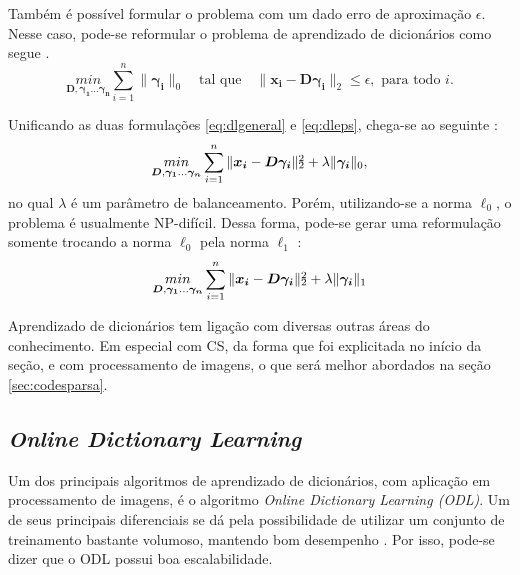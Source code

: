 \documentclass[cic,tc]{iiufrgs}
\def\SPSB#1#2{\rlap{\textsuperscript{#1}}\SB{#2}}
\def\SB#1{\textsubscript{#1}}
\renewcommand{\vec}[1]{\bm{#1}}
\newcommand{\mat}[1]{\bm{#1}}
\begin{document}
Também é possível formular o problema com um dado erro de aproximação $\epsilon$.
Nesse caso, pode-se reformular o problema de aprendizado de dicionários como segue \cite{chen2015compressed}.
\begin{equation}
    \label{eq:dleps}
    \underset{\mat{D}, \vec{\gamma_1}...\vec{\gamma_n}}{min} 
    \sum_{i=1}^{n} {\lVert \vec{\gamma_i} \rVert_0}
    \hspace{1em} \text{tal que} \hspace{1em}
    \lVert \vec{x_i} - \mat{D}\vec{\gamma_i} \rVert_2 \le \epsilon, \text{ para todo } i.
\end{equation}

Unificando as duas formulações \eqref{eq:dlgeneral} e \eqref{eq:dleps}, chega-se ao seguinte
\cite{chen2015compressed}:
\begin{equation}
    \label{eq:dlunica}
    \underset{\mat{D}, \vec{\gamma_1}...\vec{\gamma_n}}{min} 
    \sum_{i=1}^{n} {\lVert \vec{x_i} - \mat{D}\vec{\gamma_i} \rVert\SPSB{2}{2} + \lambda \lVert \vec{\gamma_i} \rVert_0},
\end{equation}
no qual $\lambda$ é um parâmetro de balanceamento.
Porém, utilizando-se a norma $\ell_0$, o problema é usualmente NP-difícil. Dessa forma, pode-se gerar
uma reformulação somente trocando a norma $\ell_0$ pela norma $\ell_1$ \cite{chen2015compressed}:
\begin{equation}
    \label{eq:dlunical1}
    \underset{\mat{D}, \vec{\gamma_1}...\vec{\gamma_n}}{min} 
    \sum_{i=1}^{n} {\lVert \vec{x_i} - \mat{D}\vec{\gamma_i} \rVert\SPSB{2}{2} + \lambda \lVert \vec{\gamma_i} \rVert_1}
\end{equation}

Aprendizado de dicionários tem ligação com diversas outras áreas do conhecimento. 
Em especial
com CS, da forma que foi explicitada no início da seção, e com processamento de imagens,
o que será melhor abordados na seção \autoref{sec:codesparsa}.

\subsection{\textit{Online Dictionary Learning}}
\label{sec:odl}
Um dos principais algoritmos de aprendizado de dicionários, com aplicação em processamento de imagens, 
é o algoritmo \textit{Online Dictionary Learning (ODL)}. Um de seus principais diferenciais
se dá pela possibilidade de utilizar um conjunto de treinamento bastante volumoso, mantendo bom 
desempenho \cite{MairalOnlineDictLearn}.
Por isso, pode-se dizer que o ODL possui boa escalabilidade.
\end{document}

